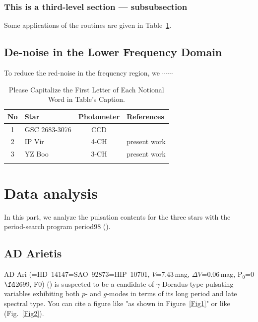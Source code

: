 \documentclass[referee]{raa}            %
\begin{document}
\subsubsection{This is a third-level section --- subsubsection}
Some applications of the routines are given in Table~\ref{Tab1}.


\subsection{De-noise in the Lower Frequency Domain}
To reduce the red-noise in the frequency region, we $\cdots\cdots$

%
\begin{table}
\begin{center}
\caption[]{ Please Capitalize the First Letter of Each Notional Word
in Table's Caption.}\label{Tab1}


 \begin{tabular}{clcl}
  \hline\noalign{\smallskip}
No &  Star      & Photometer & References                    \\
  \hline\noalign{\smallskip}
1  & GSC 2683-3076 & CCD     & \cite{Zhou+etal+2001}  \\ %
2  & IP Vir     &   4-CH     & present work                  \\
3  & YZ Boo     &   3-CH     & present work                  \\
  \noalign{\smallskip}\hline
\end{tabular}
\end{center}
\end{table}


\section{Data analysis}
\label{sect:analysis}
In this part, we analyze the pulsation contents for the three stars
with the period-search program {\sc period98}
(\citealt{Breger+1990, Sperl+1998}).


\subsection{AD Arietis}

AD Ari (=HD~14147=SAO~92873=HIP~10701, $V$=7.43\,mag,
$\Delta$$V$=0.06\,mag, P$_0$=0$\fd$2699, F0) (\citealt{Kasarovets+etal+1999, Rodriguez+etal+2000})
is suspected to be a candidate of $\gamma$ Doradus-type
pulsating variables exhibiting both $p$- and $g$-modes
in terms of its long period and late spectral type. You can cite a figure like "as shown in Figure~\ref{Fig1}" or like (Fig.~\ref{Fig2}).
\end{document}
